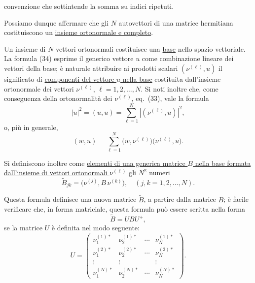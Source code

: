 \documentclass[11pt, a4paper]{book}
\numberwithin{equation}{section}
\begin{document}

convenzione che sottintende la somma su indici ripetuti.

Possiamo dunque affermare che gli $N$ autovettori di una matrice
hermitiana costituiscono un \uline{insieme ortonormale e completo}.

Un insieme di $N$ vettori ortonormali costituisce una \underline{base}
nello spazio vettoriale. La formula (34) esprime il generico vettore $u$
come combinazione lineare dei vettori della base; è naturale attribuire
ai prodotti scalari $(\nu^{(\ell)}, u)$ il significato di
\uline{componenti del vettore $u$ nella base} costituita dall'insieme
ortonormale dei vettori $\nu^{(\ell)}$, $\ell=1,2,\ldots,N$.
Si noti inoltre che, come conseguenza della ortonormalità dei $\nu^{(\ell)}$,
eq.\ (33), vale la formula
\begin{equation}
|u|^2 = (u, u) = \sum_{\ell=1}^{N} \left|(\nu^{(\ell)}, u)\right|^2,
\end{equation}
o, più in generale,
\begin{equation}
(w, u) = \sum_{\ell=1}^{N}
  \bigl(w, \nu^{(\ell)}\bigr)\bigl(\nu^{(\ell)}, u\bigr).
\end{equation}

Si definiscono inoltre come \uline{elementi di una generica matrice $B$
nella base formata dall'insieme di vettori ortonormali $\nu^{(\ell)}$} gli
$N^2$ numeri
\begin{equation}
\widetilde{B}_{jk} = \bigl(\nu^{(j)}, B\,\nu^{(k)}\bigr),
\quad (j,k = 1,2,\ldots,N).
\end{equation}

Questa formula definisce una nuova matrice $\widetilde{B}$, a partire dalla
matrice $B$; è facile verificare che, in forma matriciale, questa formula
può essere scritta nella forma
\begin{equation}
\widetilde{B} = UBU^+,
\end{equation}
se la matrice $U$ è definita nel modo seguente:
\begin{equation}
U =
\begin{pmatrix}
\nu_1^{(1)*} & \nu_2^{(1)*} & \cdots & \nu_N^{(1)*} \\
\nu_1^{(2)*} & \nu_2^{(2)*} & \cdots & \nu_N^{(2)*} \\
\vdots       & \vdots       &        & \vdots       \\
\nu_1^{(N)*} & \nu_2^{(N)*} & \cdots & \nu_N^{(N)*}
\end{pmatrix}.
\tag{40a}
\end{equation}
\end{document}
